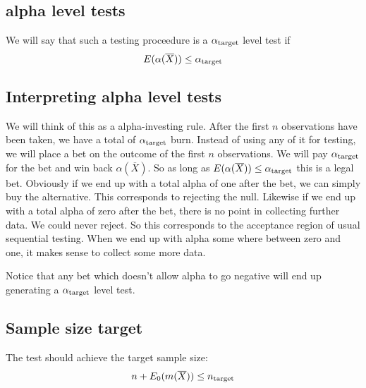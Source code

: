 \documentclass{article}
\newcommand{\target}{{\hbox{\scriptsize target}}}
\begin{document}

\subsection{alpha level tests}

We will say that such a testing proceedure is a $\alpha_\target$ level
test if
\begin{displaymath}
E(\alpha(\overline{X})) \le \alpha_\target
\end{displaymath}


\subsection{Interpreting alpha level tests}

We will think of this as a alpha-investing rule.  After the first $n$
observations have been taken, we have a total of $\alpha_\target$
burn.  Instead of using any of it for testing, we will place a bet on
the outcome of the first $n$ observations.  We will pay
$\alpha_\target$ for the bet and win back $\alpha(\overline{X})$.  So
as long as $E(\alpha(\overline{X})) \le \alpha_\target$ this is a
legal bet.  Obviously if we end up with a total alpha of one after the
bet, we can simply buy the alternative.  This corresponds to rejecting
the null.  Likewise if we end up with a total alpha of zero after the
bet, there is no point in collecting further data.  We could never
reject.  So this corresponds to the acceptance region of usual
sequential testing.  When we end up with alpha some where between zero
and one, it makes sense to collect some more data.  

Notice that any bet which doesn't allow alpha to go negative will end
up generating a $\alpha_\target$ level test.



\subsection{Sample size target}

The test should achieve the target sample size:
\begin{displaymath}
n + E_0(m(\overline{X})) \le n_\target
\end{displaymath}
\end{document}
